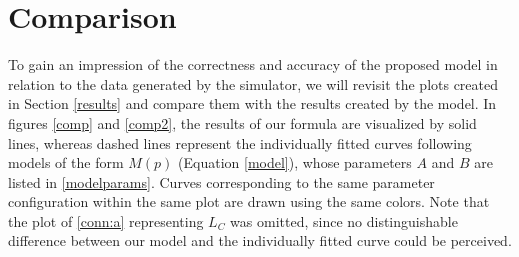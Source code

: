\documentclass[a4paper,12pt,twoside]{report}
\begin{document}
\section{Comparison} \label{modelcomp}
To gain an impression of the correctness and accuracy of the proposed model in relation to the data generated by the simulator, we will revisit the plots created in Section \ref{results} and compare them with the results created by the model. In figures \ref{comp} and \ref{comp2}, the results of our formula are visualized by solid lines, whereas dashed lines represent the individually fitted curves following models of the form $M(p)$ (Equation \ref{model}), whose parameters $A$ and $B$ are listed in \autoref{modelparams}. Curves corresponding to the same parameter configuration within the same plot are drawn using the same colors. Note that the plot of \autoref{conn:a} representing $L_C$ was omitted, since no distinguishable difference between our model and the individually fitted curve could be perceived.\\\\
\end{document}

